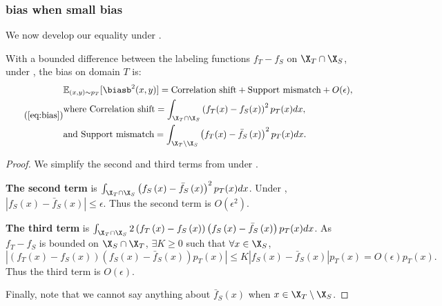 \subsubsection{\ood bias when small \iid bias}
\label{app:simplified_bias}
We now develop our equality under .
\begin{proposition*}
    With a bounded difference between the labeling functions $f_T-f_S$ on $\X_T \cap \X_S$, under , the bias on domain $T$ is:
    \begin{equation*} \tag{\ref{eq:bias}}
        \begin{aligned}
            &\mathbb{E}_{(x,y)\sim p_T}[\biasb^2(x, y)] = \text{Correlation shift} + \text{Support mismatch} + O(\epsilon), \\
            &\text{where~} \text{Correlation shift} = \int_{\X_T \cap \X_S} \left(f_T(x)-f_S(x)\right)^{2} p_T(x) dx, \\
            &\text{and~} \text{Support mismatch} = \int_{\X_T \setminus \X_S} \left(f_T(x)-\bar{f}_{S}\left(x\right)\right)^{2} p_T(x) dx.%
        \end{aligned}%
    \end{equation*}%
\end{proposition*}%
\begin{proof}
    We simplify the second and third terms from  under .

    \textbf{The second term} is $\int_{\X_T \cap \X_S} \left(f_{S}\left(x\right)-\bar{f}_{S}\left(x\right)\right)^{2} p_T(x) dx$. Under , $|f_{S}\left(x\right)-\bar{f}_{S}\left(x\right)|\leq \epsilon$. Thus the second term is $O(\epsilon^2)$.
    
    \textbf{The third term} is $\int_{\X_T \cap \X_S} 2 \left(f_T\left(x\right) - f_S\left(x\right)\right) \left(f_S\left(x\right) - \bar{f}_{S}\left(x\right)\right) p_T(x)dx$.
    As $f_T - f_S$ is bounded on $\X_S \cap \X_T$, $\exists K\geq0$ such that $\forall x \in \X_S$,
    $$
        |\left(f_T(x) - f_S(x)\right)\left(f_{S}(x) - \bar{f}_{S}\left(x\right)\right) p_T(x)| \leq K \left|f_{S}(x) - \bar{f}_{S}\left(x\right)\right|p_T(x) = O(\epsilon) p_T(x).
    $$
    Thus the third term is $O(\epsilon)$.
    
    Finally, note that we cannot say anything about $\bar{f}_{S}\left(x\right)$ when $x\in \X_T \setminus \X_S$.
\end{proof}%

